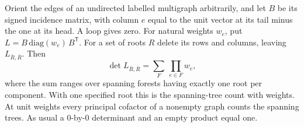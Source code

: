 \begin{theorem}\leavevmode\label{stkirchhoff}
Orient the edges of an undirected labelled multigraph arbitrarily, and let $B$ be its signed incidence matrix, with column $e$ equal to the unit vector at its tail minus the one at its head. A loop gives zero. For natural weights $w_e$, put $L=B\,\mathrm{diag}(w_e)\,B^{\mathsf T}$. For a set of roots $R$ delete its rows and columns, leaving $L_{\bar R,\bar R}$. Then
\[
 \det L_{\bar R,\bar R}=
 \sum_{F}\ \prod_{e\in F}w_e,
\]
where the sum ranges over spanning forests having exactly one root per component. With one specified root this is the spanning-tree count with weights. At unit weights every principal cofactor of a nonempty graph counts the spanning trees. As usual a $0$-by-$0$ determinant and an empty product equal one.
\end{theorem}
